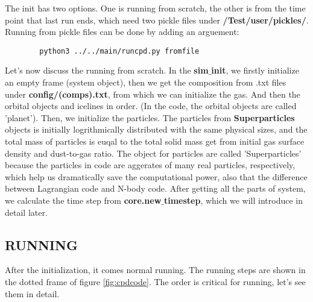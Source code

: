\documentclass[12pt]{article}
\begin{document}
The init has two options. One is running from scratch, the other is from 
the time point that last run ends, which need two pickle files under 
\textbf{/Test/user/pickles/}. Running from pickle files can be done by adding an 
arguement:
\begin{listing}[h]
    \label{code:b}
    \begin{verbatim}
        python3 ../../main/runcpd.py fromfile
    \end{verbatim}
\end{listing}

Let's now discuss the running from scratch. 
In the \textbf{sim$\_$init}, we firstly initialize an empty frame (system object), 
then we get the composition from .txt files under \textbf{config/(comps).txt}, from which 
we can initialize the gas. And then the orbital objects and icelines in order. (In the 
code, the orbital objects are called 'planet'). Then, we initialize the particles.
The particles from \textbf{Superparticles} objects is initially logrithmically 
distributed with the same physical sizes, and the total mass of particles is euqal to
the total solid mass get from initial gas surface density and dust-to-gas ratio. The 
object for particles are called 'Superparticles' because the particles in code 
are aggerates of many real particles, respectively, which help us dramatically 
save the computational power, also that the difference between Lagrangian code 
and N-body code.
After getting all the parts of system, we calculate the time 
step from \textbf{core.new$\_$timestep}, which we will introduce in detail later. 


\subsection{RUNNING}
After the initialization, it comes normal running. The running steps are 
shown in the dotted frame of figure \ref{fig:cpdcode}. The order is critical for running,
let's see them in detail.
\end{document}
